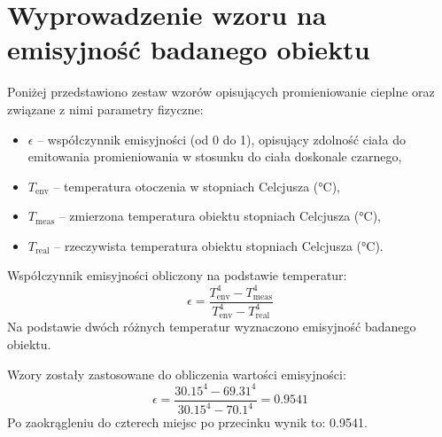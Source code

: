 \chapter*{Wyprowadzenie wzoru na emisyjność badanego obiektu}
Poniżej przedstawiono zestaw wzorów opisujących promieniowanie cieplne oraz związane z nimi parametry fizyczne:
\begin{itemize}
    \item \(\epsilon\) – współczynnik emisyjności (od 0 do 1), opisujący zdolność ciała do emitowania promieniowania w stosunku do ciała doskonale czarnego,
    \item \(T_{\text{env}}\) – temperatura otoczenia w stopniach Celcjusza (°C),
    \item \(T_{\text{meas}}\) – zmierzona temperatura obiektu stopniach Celcjusza (°C),
    \item \(T_{\text{real}}\) – rzeczywista temperatura obiektu stopniach Celcjusza (°C).
\end{itemize}
Współczynnik emisyjności obliczony na podstawie temperatur:
\[
\epsilon = \frac{T_{\text{env}}^4 - T_{\text{meas}}^4}{T_{\text{env}}^4 - T_{\text{real}}^4}
\]
Na podstawie dwóch różnych temperatur wyznaczono emisyjność badanego obiektu. 

Wzory zostały zastosowane do obliczenia wartości emisyjności:
\[
\epsilon = \frac{30.15^4 - 69.31^4}{30.15^4 - 70.1^4} = 0.9541
\]
Po zaokrągleniu do czterech miejsc po przecinku wynik to: 0.9541.